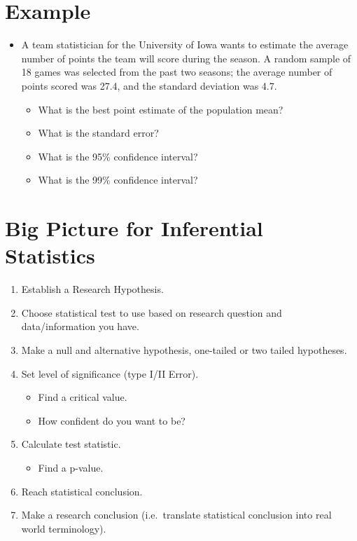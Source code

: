 \documentclass[12pt]{article}
\begin{document}
\section{Example}\label{example-1}

\begin{itemize}
\itemsep1pt\parskip0pt
\item
  A team statistician for the University of Iowa wants to estimate
  the average number of points the team will score during the season. A
  random sample of 18 games was selected from the past two seasons; the
  average number of points scored was 27.4, and the standard deviation
  was 4.7.

  \begin{itemize}
  \itemsep1pt\parskip0pt
  \item
    What is the best point estimate of the population mean?\\
  \item
    What is the standard error?
  \item
    What is the 95\% confidence interval?
  \item
    What is the 99\% confidence interval?
  \end{itemize}
\end{itemize}

\section{Big Picture for Inferential
Statistics}\label{big-picture-for-inferential-statistics}

\begin{enumerate}
\def\labelenumi{\arabic{enumi}.}
\itemsep1pt\parskip0pt
\item
  Establish a Research Hypothesis.
\item
  Choose statistical test to use based on research question and
  data/information you have.
\item
  Make a null and alternative hypothesis, one-tailed or two tailed
  hypotheses.
\item
  Set level of significance (type I/II Error).

  \begin{itemize}
  \itemsep1pt\parskip0pt
  \item
    Find a critical value.
  \item
    How confident do you want to be?
  \end{itemize}
\item
  Calculate test statistic.

  \begin{itemize}
  \itemsep1pt\parskip0pt
  \item
    Find a p-value.
  \end{itemize}
\item
  Reach statistical conclusion.
\item
  Make a research conclusion (i.e.~translate statistical conclusion into
  real world terminology).
\end{enumerate}
\end{document}
